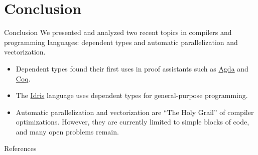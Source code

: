 \documentclass[serif, xcolor={svgnames, table}, usepdftitle=false]{beamer}
\begin{document}
\section{Conclusion}

\begin{frame}{Conclusion}
  We presented and analyzed two recent topics in compilers and
  programming languages: dependent types and automatic parallelization
  and vectorization.

  \begin{itemize}
  \item Dependent types found their first uses in proof assistants
    such as
    \href{http://wiki.portal.chalmers.se/agda/pmwiki.php}{Agda} and
    \href{https://coq.inria.fr/}{Coq}.
  \item The \href{https://www.idris-lang.org/}{Idris} language uses
    dependent types for general-purpose programming.
  \item Automatic parallelization and vectorization are ``The Holy
    Grail'' of compiler optimizations.  However, they are currently
    limited to simple blocks of code, and many open problems remain.
  \end{itemize}
\end{frame}

\begin{frame}[allowframebreaks]{References}
  \printbibliography{}
\end{frame}
\end{document}
